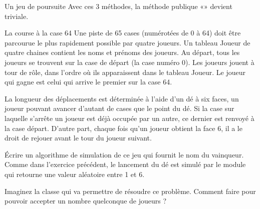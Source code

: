 \begin{Exercice}{Un jeu de poursuite}
	Avec ces 3 méthodes, la méthode publique
	«» devient triviale.
\end{Exercice}

\begin{Exercice}{La course à la case 64}
	Une piste de 65 cases (numérotées de 0 à 64)
	doit être parcourue le plus rapidement possible par quatre joueurs. Un
	tableau Joueur de quatre chaines contient les noms et prénoms des
	joueurs. Au départ, tous les joueurs se trouvent sur la case de départ
	(la case numéro 0). Les joueurs jouent à tour de rôle, dans l’ordre où
	ils apparaissent dans le tableau Joueur. Le joueur qui gagne est celui
	qui arrive le premier sur la case 64.

	La longueur des déplacements est déterminée à
	l’aide d’un dé à six faces, un joueur pouvant avancer d’autant de cases
	que le point du dé. Si la case sur laquelle s’arrête un joueur est déjà
	occupée par un autre, ce dernier est renvoyé à la case départ. D’autre
	part, chaque fois qu’un joueur obtient la face 6, il a le droit de
	rejouer avant le tour du joueur suivant. 

	Écrire un algorithme de simulation de ce jeu
	qui fournit le nom du vainqueur. Comme dans l’exercice précédent, le
	lancement du dé est simulé par le module  qui retourne une valeur aléatoire entre 1 et 6.

	Imaginez la classe  qui va permettre
	de résoudre ce problème. Comment faire pour pouvoir accepter un nombre
	quelconque de joueurs ?
\end{Exercice}


